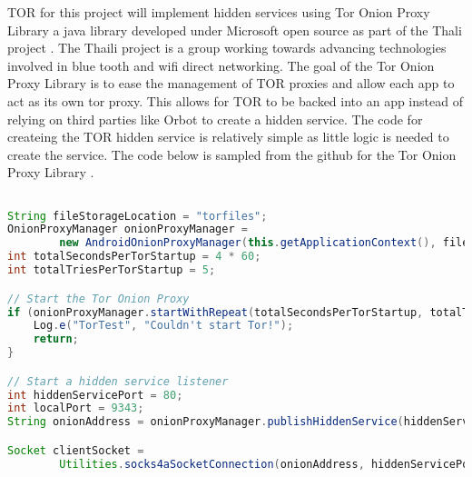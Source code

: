 \documentclass[../main/main.tex]{subfiles}
\begin{document}
TOR for this project will implement hidden services using Tor Onion Proxy Library a java library \cite{THALIGIT} developed under Microsoft open source as part of the Thali project \cite{THALI}. 
The Thaili project is a group working towards advancing technologies involved in blue tooth and wifi direct networking.
The goal of the Tor Onion Proxy Library is to ease the management of TOR proxies and allow each app to act as its own tor proxy. 
This allows for TOR to be backed into an app instead of relying on third parties like Orbot to create a hidden service. 
The code for createing the TOR hidden service is relatively simple as little logic is needed to create the service. The code below is sampled from the github for the Tor Onion Proxy Library \cite{THALIGIT}.

\begin{lstlisting}[caption={Psuedocode for send().}, label={lst:example5}, language=Java]

String fileStorageLocation = "torfiles";
OnionProxyManager onionProxyManager =
        new AndroidOnionProxyManager(this.getApplicationContext(), fileStorageLocation);
int totalSecondsPerTorStartup = 4 * 60;
int totalTriesPerTorStartup = 5;

// Start the Tor Onion Proxy
if (onionProxyManager.startWithRepeat(totalSecondsPerTorStartup, totalTriesPerTorStartup, true) == false) {
    Log.e("TorTest", "Couldn't start Tor!");
    return;
}

// Start a hidden service listener
int hiddenServicePort = 80;
int localPort = 9343;
String onionAddress = onionProxyManager.publishHiddenService(hiddenServicePort, localPort);

Socket clientSocket =
        Utilities.socks4aSocketConnection(onionAddress, hiddenServicePort, "127.0.0.1", localPort);


\end{lstlisting}

\end{document}

